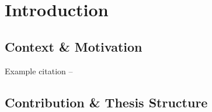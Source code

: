 \chapter{\label{ch:1-intro}Introduction} 

\section{Context \& Motivation}
Example citation -- \cite{Yordanov2020}

\section{Contribution \& Thesis Structure}

